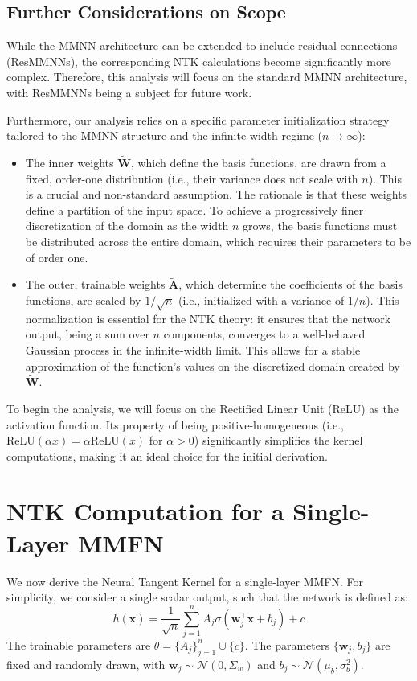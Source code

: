 \documentclass{article}
\begin{document}
\subsection{Further Considerations on Scope}
While the MMNN architecture can be extended to include residual connections (ResMMNNs), the corresponding NTK calculations become significantly more complex. Therefore, this analysis will focus on the standard MMNN architecture, with ResMMNNs being a subject for future work.

Furthermore, our analysis relies on a specific parameter initialization strategy tailored to the MMNN structure and the infinite-width regime ($n \to \infty$):
\begin{itemize}
    \item The inner weights $\tilde{\bm{W}}$, which define the basis functions, are drawn from a fixed, order-one distribution (i.e., their variance does not scale with $n$). This is a crucial and non-standard assumption. The rationale is that these weights define a partition of the input space. To achieve a progressively finer discretization of the domain as the width $n$ grows, the basis functions must be distributed across the entire domain, which requires their parameters to be of order one.
    \item The outer, trainable weights $\tilde{\bm{A}}$, which determine the coefficients of the basis functions, are scaled by $1/\sqrt{n}$ (i.e., initialized with a variance of $1/n$). This normalization is essential for the NTK theory: it ensures that the network output, being a sum over $n$ components, converges to a well-behaved Gaussian process in the infinite-width limit. This allows for a stable approximation of the function's values on the discretized domain created by $\tilde{\bm{W}}$.
\end{itemize}
To begin the analysis, we will focus on the Rectified Linear Unit (ReLU) as the activation function. Its property of being positive-homogeneous (i.e., $\text{ReLU}(\alpha x) = \alpha \text{ReLU}(x)$ for $\alpha > 0$) significantly simplifies the kernel computations, making it an ideal choice for the initial derivation.

\section{NTK Computation for a Single-Layer MMFN}
We now derive the Neural Tangent Kernel for a single-layer MMFN. For simplicity, we consider a single scalar output, such that the network is defined as:
\begin{equation}
    h(\bm{x}) = \frac{1}{\sqrt{n}} \sum_{j=1}^n A_j \sigma(\bm{w}_j^\top \bm{x} + b_j) + c
\end{equation}
The trainable parameters are $\theta = \{A_j\}_{j=1}^n \cup \{c\}$. The parameters $\{\bm{w}_j, b_j\}$ are fixed and randomly drawn, with $\bm{w}_j \sim \mathcal{N}(0, \Sigma_w)$ and $b_j \sim \mathcal{N}(\mu_b, \sigma_b^2)$.
\end{document}
